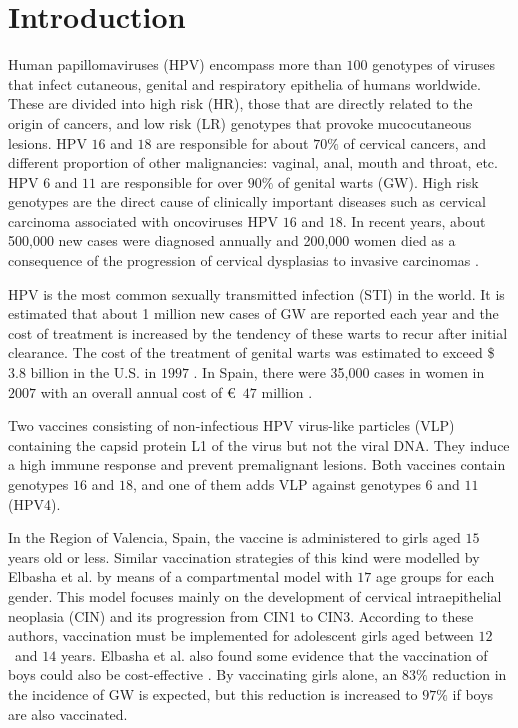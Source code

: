 \section{Introduction}

Human papillomaviruses (HPV) encompass more than $100$ genotypes of viruses that infect cutaneous, genital and respiratory epithelia of humans worldwide. These are divided into high risk (HR), those that are directly related to the origin of cancers, and low risk (LR) genotypes that provoke mucocutaneous lesions. HPV $16$ and $18$ are responsible for about $70\%$ of cervical cancers, and different proportion of other malignancies: vaginal, anal, mouth and throat, etc.
HPV $6$ and $11$ are responsible for over $90\%$ of genital warts (GW). High risk genotypes are the direct cause of clinically important diseases such as cervical carcinoma associated with oncoviruses HPV $16$ and $18$. In recent years, about 500,000 new cases were diagnosed annually and 200,000 women died as a consequence of the progression of cervical dysplasias to invasive carcinomas \cite{Pathology}.

HPV is the most common sexually transmitted infection (STI) in the world. It is estimated that about 1 million new cases of GW are reported each year and the cost of treatment is increased by the tendency of these warts to recur after initial clearance. The cost of the treatment of genital warts was estimated to exceed \$ $3.8$ billion in the U.S. in $1997$ \cite{Roberts}. In Spain, there were 35,000 cases in women in $2007$ with an overall annual cost of \euro \ $47$ million \cite{CLEOPATRE}.

Two vaccines consisting of non-infectious HPV virus-like particles (VLP) \cite{McNeil} containing the capsid protein L1 of the virus but not the viral DNA. They induce a high immune response and prevent premalignant lesions. Both vaccines contain genotypes $16$ and $18$, and one of them adds VLP against genotypes $6$ and $11$ (HPV4).

In the Region of Valencia, Spain, the vaccine is administered to girls aged $15$ years old or less. Similar vaccination strategies of this kind were modelled by Elbasha et al. \cite{Elbasha1,Elbasha2} by means of a compartmental model with $17$ age groups for each gender. This model focuses mainly on the development of cervical intraepithelial neoplasia (CIN) and its progression from CIN1 to CIN3. According to these authors, vaccination must be implemented for adolescent girls aged between $12$~and $14$ years. Elbasha et al. also found some evidence that the vaccination of boys could also be cost-effective \cite{Elbasha1}. By vaccinating girls alone, an $83\%$ reduction in the incidence of GW is expected, but this reduction is increased to $97\%$ if boys are also vaccinated.

